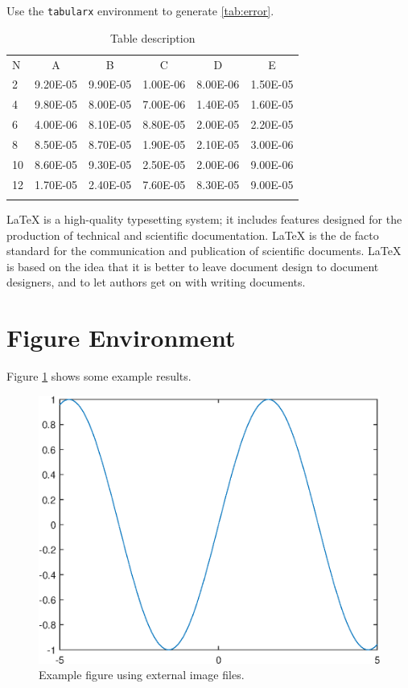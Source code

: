 \documentclass[openany,twoside,12pt]{book}
\theoremstyle{plain}
\numberwithin{equation}{chapter}
\numberwithin{figure}{chapter}
\numberwithin{table}{chapter}
\begin{document}
Use the \texttt{tabularx} environment to generate \autoref{tab:error}.

\begin{table}[htp!]
\centering
\renewcommand\arraystretch{1.2}
\caption{Table description}
\label{tab:error}
\begin{tabularx}{0.8\textwidth}{|P{0.8cm}|C|C|C|C|C|}
\Xhline{2\arrayrulewidth}
N  & A       & B    & C       & D      & E     \\
\Xhline{2\arrayrulewidth}
2  & 9.20E-05 & 9.90E-05 & 1.00E-06 & 8.00E-06 & 1.50E-05 \\
4  & 9.80E-05 & 8.00E-05 & 7.00E-06 & 1.40E-05 & 1.60E-05 \\
6  & 4.00E-06 & 8.10E-05 & 8.80E-05 & 2.00E-05 & 2.20E-05 \\
8  & 8.50E-05 & 8.70E-05 & 1.90E-05 & 2.10E-05 & 3.00E-06 \\
10 & 8.60E-05 & 9.30E-05 & 2.50E-05 & 2.00E-06 & 9.00E-06 \\
12 & 1.70E-05 & 2.40E-05 & 7.60E-05 & 8.30E-05 & 9.00E-05 \\
\Xhline{2\arrayrulewidth}
\end{tabularx}
\end{table}

LaTeX is a high-quality typesetting system; it includes features designed
for the production of technical and scientific documentation.
LaTeX is the de facto standard for the communication and publication of scientific documents.
LaTeX is based on the idea that it is better to leave document design to
document designers, and to let authors get on with writing documents.


\section{Figure Environment}

Figure \ref{fig:sinx} shows some example results.
\begin{figure}[htp!]
  \centering
  \includegraphics[width=0.48\linewidth]{image1}
  \caption{Example figure using external image files.}
  \label{fig:sinx}
\end{figure}
\end{document}
